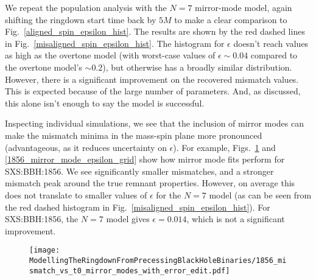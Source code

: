 We repeat the population analysis with the $N=7$ mirror-mode model, again shifting the ringdown start time back by $5M$ to make a clear comparison to Fig.~\ref{aligned_spin_epsilon_hist}. 
The results are shown by the red dashed lines in Fig.~\ref{misaligned_spin_epsilon_hist}. The histogram for $\epsilon$ doesn't reach values as high as the overtone model (with worst-case values of $\epsilon \sim 0.04$ compared to the overtone model's $\sim 0.2$), but otherwise has a broadly similar distribution.
However, there is a significant improvement on the recovered mismatch values. This is expected because of the large number of parameters. And, as discussed, this alone isn't enough to say the model is successful.

Inspecting individual simulations, we see that the inclusion of mirror modes can make the mismatch minima in the mass-spin plane more pronounced (advantageous, as it reduces uncertainty on $\epsilon$). For example, Figs.~\ref{1856_mirror_mode_mismatch_vs_t0} and \ref{1856_mirror_mode_epsilon_grid} show how mirror mode fits perform for SXS:BBH:1856. 
We see significantly smaller mismatches, and a stronger mismatch peak around the true remnant properties. However, on average this does not translate to smaller values of $\epsilon$ for the $N=7$ model (as can be seen from the red dashed histogram in Fig.~\ref{misaligned_spin_epsilon_hist}). For SXS:BBH:1856, the $N=7$ model gives $\epsilon = 0.014$, which is not a significant improvement.

\begin{figure}[t]
    \centering
    \texttt{[image: ModellingTheRingdownFromPrecessingBlackHoleBinaries/1856\_mismatch\_vs\_t0\_mirror\_modes\_with\_error\_edit.pdf]}
    \caption[Mismatch as a function of ringdown start time for the mirror-mode model fitted to SXS:BBH:1856]{ 
    }
    \label{1856_mirror_mode_mismatch_vs_t0}
\end{figure}

